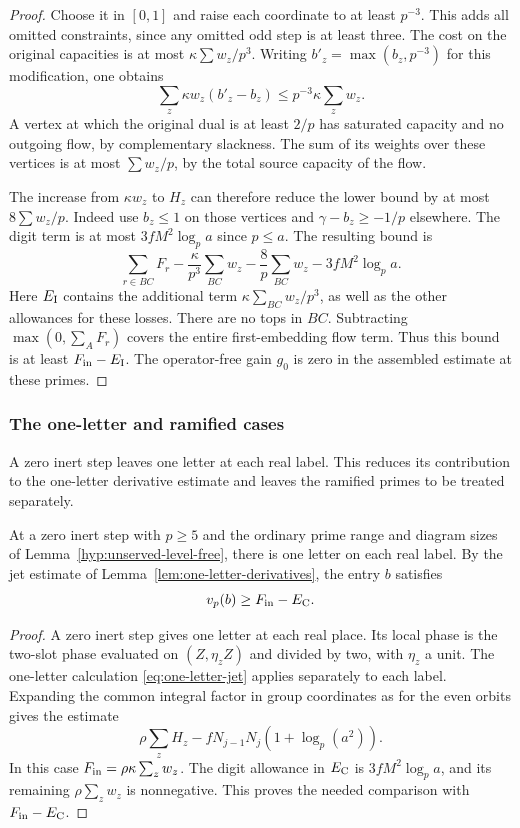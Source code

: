 \begin{proof}
Choose it in
\([0,1]\) and raise each coordinate to at least \(p^{-3}\).
This adds all omitted constraints, since any omitted odd
step is at least three. The cost on the original capacities
is at most \(\kappa\sum w_z/p^3\).
Writing \(b'_z=\max(b_z,p^{-3})\) for this modification, one obtains
\[
  \sum_z\kappa w_z(b'_z-b_z)\le p^{-3}\kappa\sum_z w_z .
\]
 A vertex at which the
original dual is at least \(2/p\) has saturated capacity
and no outgoing flow, by complementary slackness.
The sum of its weights over these vertices is at most
\(\sum w_z/p\), by the total source capacity of the flow.

The increase from \(\kappa w_z\) to \(H_z\) can therefore
reduce the lower bound by at most \(8\sum w_z/p\).
Indeed use \(b_z\le1\) on those vertices and
\(\gamma-b_z\ge-1/p\) elsewhere. The digit term is at most
\(3fM^2\log_p a\) since \(p\le a\). The resulting bound is
\[
 \sum_{r\in BC}F_r-
     \frac{\kappa}{p^3}\sum_{BC}w_z-
     \frac8p\sum_{BC}w_z-3fM^2\log_p a .
\]
Here \(E_{\rm I}\) contains the additional term
\(\kappa\sum_{BC}w_z/p^3\), as well as the other
allowances for these losses. There are no tops in \(BC\).
Subtracting \(\max(0,\sum_A F_r)\) covers the entire
first-embedding flow term. Thus this bound is at least
\(F_{\rm in}-E_{\rm I}\). The operator-free gain \(g_0\)
is zero in the assembled estimate at these primes.

\end{proof}

\subsubsection{The one-letter and ramified cases}

A zero inert step leaves one letter at each real label. This reduces its contribution to the one-letter derivative estimate and leaves the ramified primes to be treated separately.

\begin{proposition}\label{prop:unserved-zero-entries}
At a zero inert step with \(p\ge5\) and the ordinary prime range
and diagram sizes of Lemma~\ref{hyp:unserved-level-free}, there
is one letter on each real label. By the jet estimate of
Lemma~\ref{lem:one-letter-derivatives}, the entry \(b\) satisfies
\[
 v_p(b)\ge F_{\rm in}-E_{\rm C}.
\]

\end{proposition}

\begin{proof}
A zero inert step gives one letter at each real place.
Its local phase is the two-slot phase evaluated on
\((Z,\eta_z Z)\) and divided by two, with \(\eta_z\)
a unit. The one-letter calculation
\eqref{eq:one-letter-jet} applies separately to each label.
Expanding the common integral factor in group coordinates
as for the even orbits gives the estimate
\[
          \rho\sum_z H_z-f N_{j-1}N_j(1+\log_p(a^2)).
\]
In this case \(F_{\rm in}=\rho\kappa\sum_z w_z\).
The digit allowance in \(E_{\rm C}\) is
\(3 fM^2\log_p a\), and its remaining
\(\rho\sum_z w_z\) is nonnegative. This proves the
needed comparison with \(F_{\rm in}-E_{\rm C}\).

\end{proof}

